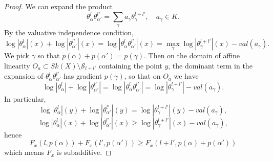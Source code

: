 \documentclass[10pt,a4paper]{amsart}
\begin{document}
\begin{proof}
We can expand the product
\[
\theta_\alpha^l \theta_{\alpha'}^{l'}= \sum_\gamma a_\gamma \theta_\gamma^{l+l'},\quad a_\gamma\in K.
\]
By the valuative independence condition, 
\[
\log |\theta_\alpha^l |(x) + \log | \theta_{\alpha'}^{l'}|(x)= \log |\theta_\alpha^l \theta_{\alpha'}^{l'}|(x) =\max_\gamma \log  |\theta_\gamma^{l+l'}|(x)- val(a_\gamma).
\]
We pick $\gamma$ so that $p(\alpha)+ p(\alpha')= p(\gamma)$. Then  on the domain of affine linearity $O_a\subset Sk(X)\setminus \mathcal{S}_{l+l'}$ containing the point $y$, the dominant term in the  expansion of $\theta_\alpha^l \theta_{\alpha'}^{l'}$ has gradient $p(\gamma)$, so that on $O_a$ we have
\[
\log |\theta_\alpha^l |+  \log | \theta_{\alpha'}^{l'}|= \log |\theta_\alpha^l \theta_{\alpha'}^{l'}|= \log |\theta_\gamma^{l+l'}|- val(a_\gamma).
\]
In particular,
\[
\log |\theta_\alpha^l |(y)+  \log | \theta_{\alpha'}^{l'}|(y)= \log |\theta_\gamma^{l+l'}|(y)- val(a_\gamma),
\]
\[
\log |\theta_\alpha^l |(x)+  \log | \theta_{\alpha'}^{l'}|(x)\geq  \log |\theta_\gamma^{l+l'}|(x)- val(a_\gamma),
\]
hence
\[
F_x(l, p(\alpha))+ F_x(l', p(\alpha')) \geq F_x(l+l',   p(\alpha)+p(\alpha'))
\]
which means $F_x$ is subadditive.
\end{proof}
\end{document}
